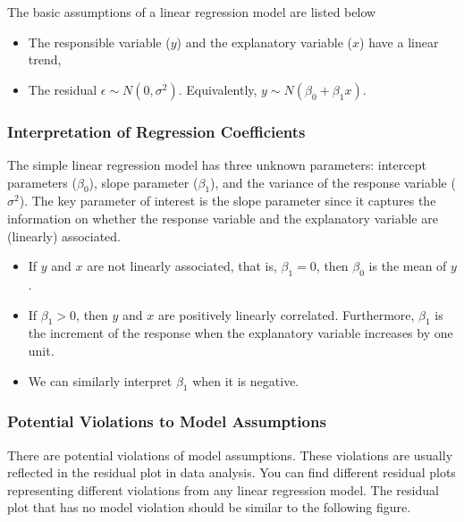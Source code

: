 \documentclass[
]{book}
\begin{document}
The basic assumptions of a linear regression model are listed below

\begin{itemize}
\item
  The responsible variable (\(y\)) and the explanatory variable (\(x\)) have a linear trend,
\item
  The residual \(\epsilon \sim N(0, \sigma^2)\). Equivalently, \(y \sim N(\beta_0 + \beta_1 x)\).
\end{itemize}

\hypertarget{interpretation-of-regression-coefficients}{%
\subsubsection{Interpretation of Regression Coefficients}\label{interpretation-of-regression-coefficients}}

The simple linear regression model has three unknown parameters: intercept parameters (\(\beta_0\)), slope parameter (\(\beta_1\)), and the variance of the response variable (\(\sigma^2\)). The key parameter of interest is the slope parameter since it captures the information on whether the response variable and the explanatory variable are (linearly) associated.

\begin{itemize}
\item
  If \(y\) and \(x\) are not linearly associated, that is, \(\beta_1 = 0\), then \(\beta_0\) is the mean of \(y\).
\item
  If \(\beta_1 > 0\), then \(y\) and \(x\) are positively linearly correlated. Furthermore, \(\beta_1\) is the increment of the response when the explanatory variable increases by one unit.
\item
  We can similarly interpret \(\beta_1\) when it is negative.
\end{itemize}

\hypertarget{potential-violations-to-model-assumptions}{%
\subsubsection{Potential Violations to Model Assumptions}\label{potential-violations-to-model-assumptions}}

There are potential violations of model assumptions. These violations are usually reflected in the residual plot in data analysis. You can find different residual plots representing different violations from any linear regression model. The residual plot that has no model violation should be similar to the following figure.
\end{document}
